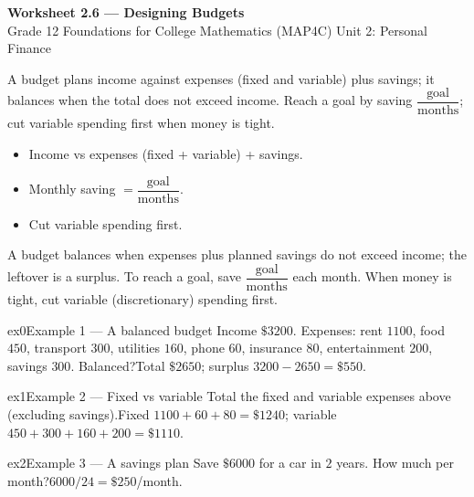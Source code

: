 \documentclass[11pt]{article}
\begin{document}
\begin{center}
{\LARGE\bfseries\color{titleblue}Worksheet 2.6 --- Designing Budgets}\\[2pt]
{\small Grade 12 Foundations for College Mathematics (MAP4C) \textperiodcentered{} Unit 2: Personal Finance}
\end{center}

\begin{ideabox}
A budget plans income against expenses (fixed and variable) plus savings; it balances when the total does not exceed income. Reach a goal by saving $\dfrac{\text{goal}}{\text{months}}$; cut variable spending first when money is tight.
\begin{itemize}[leftmargin=*,itemsep=2pt]
  \item Income vs expenses (fixed + variable) + savings.
  \item Monthly saving $=\dfrac{\text{goal}}{\text{months}}$.
  \item Cut variable spending first.
\end{itemize}
\end{ideabox}

\begin{learnbox}
A budget balances when expenses plus planned savings do not exceed income; the leftover is a surplus.
To reach a goal, save $\dfrac{\text{goal}}{\text{months}}$ each month.
When money is tight, cut variable (discretionary) spending first.
\end{learnbox}


\begin{example}{ex0}{Example 1 --- A balanced budget}
Income $\$3200$. Expenses: rent $1100$, food $450$, transport $300$, utilities $160$, phone $60$, insurance $80$, entertainment $200$, savings $300$. Balanced?\soln Total $\$2650$; surplus $3200-2650=\$550$.
\end{example}

\begin{example}{ex1}{Example 2 --- Fixed vs variable}
Total the fixed and variable expenses above (excluding savings).\soln Fixed $1100+60+80=\$1240$; variable $450+300+160+200=\$1110$.
\end{example}

\begin{example}{ex2}{Example 3 --- A savings plan}
Save $\$6000$ for a car in $2$ years. How much per month?\soln $6000/24=\$250$/month.
\end{example}
\end{document}
